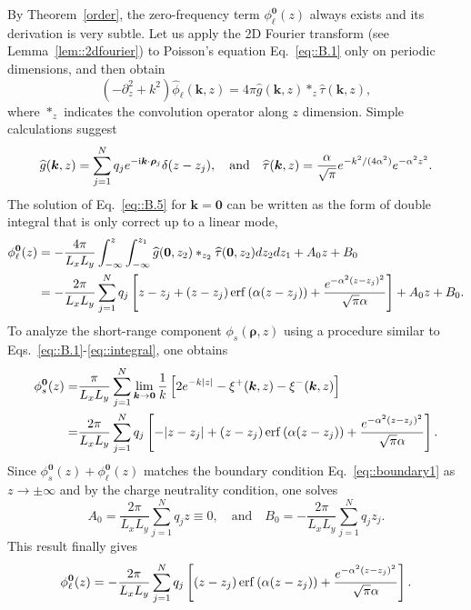 By Theorem~\ref{order}, the zero-frequency term $\phi^{\bm{0}}_{\ell}(z)$ always exists and its derivation is very subtle. Let us apply the 2D Fourier transform (see Lemma~\ref{lem::2dfourier}) to Poisson's equation Eq.~\eqref{eq::B.1} only on periodic dimensions, and then obtain
\begin{equation}\label{eq::B.5}
	(-\partial_z^2+k^2)\widehat{\phi}_{\ell}(\bm{k},z)=4\pi\widehat{g}(\bm{k},z)\ast_{z}\widehat{\tau}(\bm{k},z),
\end{equation}
where $\ast_z$ indicates the convolution operator along $z$ dimension. Simple calculations suggest
\begin{equation}
	\widehat{g}(\bm{k},z)=\sum_{j=1}^{N}q_{j} e^{-\mathrm{i} \bm{k}\cdot\bm{\rho}_{j}}\delta(z-z_{j}),\quad\text{and}\quad \widehat{\tau}(\bm{k},z)=\frac{\alpha}{\sqrt{\pi}} e^{-k^2/(4\alpha^2)}e^{-\alpha^2z^2}.
\end{equation}
The solution of Eq.~\eqref{eq::B.5} for $\bm{k}=\bm{0}$ can be written as the form of double integral that is only correct up to a linear mode,
\begin{equation}\begin{split}
		\phi_{\ell}^{\bm{0}}(z)&=-\frac{4\pi}{L_xL_y}\int_{-\infty}^{z}\int_{-\infty}^{z_1}\widehat{g}(\bm{0},z_2)\ast_{z_2}\widehat{\tau}(\bm{0},z_2)dz_2dz_1+A_0z+B_0\\
		&=-\frac{2\pi}{L_xL_y}\sum_{j=1}^{N}q_{j}\left[z-z_{j}+(z-z_{j})\operatorname{erf}\left(\alpha(z-z_{j})\right)+\frac{e^{-\alpha^2(z-z_{j})^2}}{\sqrt{\pi}\alpha}\right]+A_0z+B_0.
	\end{split}
\end{equation}
To analyze the short-range component $\phi_{s}(\bm{\rho},z)$ using a procedure similar to Eqs.~\eqref{eq::B.1}-\eqref{eq::integral}, one obtains
\begin{equation}\begin{split}
		\phi_{s}^{\bm{0}}(z) =& \frac{\pi}{L_x L_y} \sum_{j=1}^{N} \lim_{\bm{k}\rightarrow\bm{0}} \frac{1}{k} \left[2e^{-k|z|}-\xi^{+}(\bm{k},z) - \xi^{-}(\bm{k},z)\right]\\
		=& \frac{2\pi}{L_xL_y}\sum_{j=1}^{N}q_{j}\left[-|z-z_{j}|+(z-z_{j})\operatorname{erf}\left(\alpha(z-z_{j})\right)+\frac{e^{-\alpha^2(z-z_{j})^2}}{\sqrt{\pi}\alpha}\right].
	\end{split}
\end{equation}
Since $\phi_{s}^{\bm{0}}(z)+\phi_{\ell}^{\bm{0}}(z)$ matches the boundary condition Eq.~\eqref{eq::boundary1} as $z\rightarrow \pm\infty$ and by the charge neutrality condition, one solves 
\begin{equation}
	A_0 = \frac{2\pi}{L_xL_y}\sum_{j=1}^{N}q_{j}z \equiv 0,\quad \text{and}\quad B_0=-\frac{2\pi}{L_xL_y}\sum_{j=1}^{N}q_{j}z_{j}.
\end{equation}
This result finally gives 
\begin{equation}
	\phi_{\ell}^{\bm{0}}(z)=-\frac{2\pi}{L_xL_y}\sum_{j=1}^{N}q_{j}\left[(z-z_{j})\operatorname{erf}\left(\alpha(z-z_{j})\right)+\frac{e^{-\alpha^2(z-z_{j})^2}}{\sqrt{\pi}\alpha}\right].
\end{equation}

